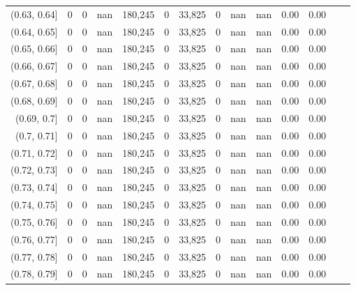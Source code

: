 \begin{tabular}{rrrrrrrrrrrrrr}
(0.63, 0.64]   &       0 &      0 &     nan &  180,245 &        0 &  33,825 &       0 &   nan &   nan &  0.00 &      0.00 \\
(0.64, 0.65]   &       0 &      0 &     nan &  180,245 &        0 &  33,825 &       0 &   nan &   nan &  0.00 &      0.00 \\
(0.65, 0.66]   &       0 &      0 &     nan &  180,245 &        0 &  33,825 &       0 &   nan &   nan &  0.00 &      0.00 \\
(0.66, 0.67]   &       0 &      0 &     nan &  180,245 &        0 &  33,825 &       0 &   nan &   nan &  0.00 &      0.00 \\
(0.67, 0.68]   &       0 &      0 &     nan &  180,245 &        0 &  33,825 &       0 &   nan &   nan &  0.00 &      0.00 \\
(0.68, 0.69]   &       0 &      0 &     nan &  180,245 &        0 &  33,825 &       0 &   nan &   nan &  0.00 &      0.00 \\
(0.69, 0.7]    &       0 &      0 &     nan &  180,245 &        0 &  33,825 &       0 &   nan &   nan &  0.00 &      0.00 \\
(0.7, 0.71]    &       0 &      0 &     nan &  180,245 &        0 &  33,825 &       0 &   nan &   nan &  0.00 &      0.00 \\
(0.71, 0.72]   &       0 &      0 &     nan &  180,245 &        0 &  33,825 &       0 &   nan &   nan &  0.00 &      0.00 \\
(0.72, 0.73]   &       0 &      0 &     nan &  180,245 &        0 &  33,825 &       0 &   nan &   nan &  0.00 &      0.00 \\
(0.73, 0.74]   &       0 &      0 &     nan &  180,245 &        0 &  33,825 &       0 &   nan &   nan &  0.00 &      0.00 \\
(0.74, 0.75]   &       0 &      0 &     nan &  180,245 &        0 &  33,825 &       0 &   nan &   nan &  0.00 &      0.00 \\
(0.75, 0.76]   &       0 &      0 &     nan &  180,245 &        0 &  33,825 &       0 &   nan &   nan &  0.00 &      0.00 \\
(0.76, 0.77]   &       0 &      0 &     nan &  180,245 &        0 &  33,825 &       0 &   nan &   nan &  0.00 &      0.00 \\
(0.77, 0.78]   &       0 &      0 &     nan &  180,245 &        0 &  33,825 &       0 &   nan &   nan &  0.00 &      0.00 \\
(0.78, 0.79]   &       0 &      0 &     nan &  180,245 &        0 &  33,825 &       0 &   nan &   nan &  0.00 &      0.00 \\

\end{tabular}
